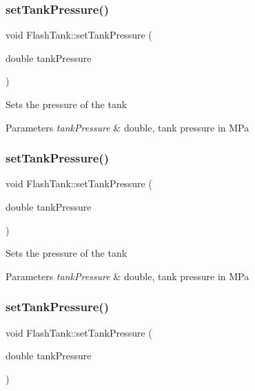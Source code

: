 \subsubsection{\texorpdfstring{set\+Tank\+Pressure()}{setTankPressure()}\hspace{0.1cm}{\footnotesize\ttfamily [1/3]}}
{\footnotesize\ttfamily void Flash\+Tank\+::set\+Tank\+Pressure (\begin{DoxyParamCaption}\item[{double}]{tank\+Pressure }\end{DoxyParamCaption})}

Sets the pressure of the tank 
\begin{DoxyParams}{Parameters}
{\em tank\+Pressure} & double, tank pressure in M\+Pa \\
\hline
\end{DoxyParams}
\mbox{\label{class_flash_tank_a8b3bb51a62dac4f76284dfdc114d83fe}} 
\subsubsection{\texorpdfstring{set\+Tank\+Pressure()}{setTankPressure()}\hspace{0.1cm}{\footnotesize\ttfamily [2/3]}}
{\footnotesize\ttfamily void Flash\+Tank\+::set\+Tank\+Pressure (\begin{DoxyParamCaption}\item[{double}]{tank\+Pressure }\end{DoxyParamCaption})}

Sets the pressure of the tank 
\begin{DoxyParams}{Parameters}
{\em tank\+Pressure} & double, tank pressure in M\+Pa \\
\hline
\end{DoxyParams}
\mbox{\label{class_flash_tank_a8b3bb51a62dac4f76284dfdc114d83fe}} 
\subsubsection{\texorpdfstring{set\+Tank\+Pressure()}{setTankPressure()}\hspace{0.1cm}{\footnotesize\ttfamily [3/3]}}
{\footnotesize\ttfamily void Flash\+Tank\+::set\+Tank\+Pressure (\begin{DoxyParamCaption}\item[{double}]{tank\+Pressure }\end{DoxyParamCaption})}

